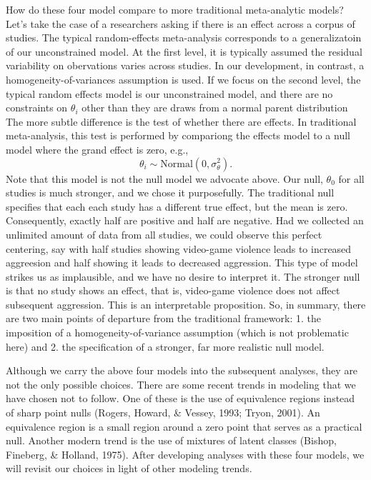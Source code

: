 \documentclass[english,man]{apa6}
\theoremstyle{definition}
\theoremstyle{definition}
\theoremstyle{remark}
\begin{document}
How do these four model compare to more traditional meta-analytic
models? Let's take the case of a researchers asking if there is an
effect across a corpus of studies. The typical random-effects
meta-analysis corresponds to a generalizatoin of our unconstrained
model. At the first level, it is typically assumed the residual
variability on obervations varies across studies. In our development, in
contrast, a homogeneity-of-variances assumption is used. If we focus on
the second level, the typical random effects model is our unconstrained
model, and there are no constraints on \(\theta_i\) other than they are
draws from a normal parent distribution The more subtle difference is
the test of whether there are effects. In traditional meta-analysis,
this test is performed by compariong the effects model to a null model
where the grand effect is zero, e.g., \[
\theta_i \sim \mbox{Normal}(0,\sigma^2_\theta).
\] Note that this model is not the null model we advocate above. Our
null, \(\theta_0\) for all studies is much stronger, and we chose it
purposefully. The traditional null specifies that each each study has a
different true effect, but the mean is zero. Consequently, exactly half
are positive and half are negative. Had we collected an unlimited amount
of data from all studies, we could observe this perfect centering, say
with half studies showing video-game violence leads to increased
aggreesion and half showing it leads to decreased aggression. This type
of model strikes us as implausible, and we have no desire to interpret
it. The stronger null is that no study shows an effect, that is,
video-game violence does not affect subsequent aggression. This is an
interpretable proposition. So, in summary, there are two main points of
departure from the traditional framework: 1. the imposition of a
homogeneity-of-variance assumption (which is not problematic here) and
2. the specification of a stronger, far more realistic null model.

Although we carry the above four models into the subsequent analyses,
they are not the only possible choices. There are some recent trends in
modeling that we have chosen not to follow. One of these is the use of
equivalence regions instead of sharp point nulls (Rogers, Howard, \&
Vessey, 1993; Tryon, 2001). An equivalence region is a small region
around a zero point that serves as a practical null. Another modern
trend is the use of mixtures of latent classes (Bishop, Fineberg, \&
Holland, 1975). After developing analyses with these four models, we
will revisit our choices in light of other modeling trends.
\end{document}
